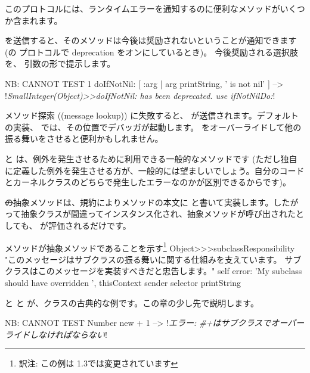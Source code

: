\documentclass[a4paper,10pt,twoside]{book}
\begin{document}
このプロトコルには、ランタイムエラーを通知するのに便利なメソッドがいくつか含まれます。

 を送信すると、そのメソッドは今後は奨励されないということが通知できます(の  プロトコルで deprecation をオンにしているとき)。
今後奨励される選択肢を、 引数の形で提示します。

\begin{code}{NB: CANNOT TEST}
1 doIfNotNil: [ :arg | arg printString, ' is not nil' ]
  --> !\emph{SmallInteger(Object)>>doIfNotNil: has been deprecated. use ifNotNilDo:}!
\end{code}

メソッド探索 ((message lookup)) に失敗すると、 が送信されます。デフォルトの実装、\ie{} では、その位置でデバッガが起動します。 をオーバーライドして他の振る舞いをさせると便利かもしれません。


 と  は、例外を発生させるために利用できる一般的なメソッドです
(ただし独自に定義した例外を発生させる方が、一般的には望ましいでしょう。自分のコードとカーネルクラスのどちらで発生したエラーなのかが区別できるからです)。

\st の抽象メソッドは、規約によりメソッドの本文に  と書いて実装します。したがって抽象クラスが間違ってインスタンス化され、抽象メソッドが呼び出されたとしても、 が評価されるだけです。

\begin{method}{メソッドが抽象メソッドであることを示す\protect\footnote{訳注: この例は \pharo 1.3では変更されています}}
Object>>>subclassResponsibility
    "このメッセージはサブクラスの振る舞いに関する仕組みを支えています。
    サブクラスはこのメッセージを実装すべきだと忠告します。"
    self error: 'My subclass should have overridden ', thisContext sender selector printString
\end{method}

 と  と  が、クラスの古典的な例です。この章の少し先で説明します。

\begin{code}{NB: CANNOT TEST}
Number new + 1 --> !\emph{エラー: \#+はサブクラスでオーバーライドしなければならない}!
\end{code}
\end{document}
